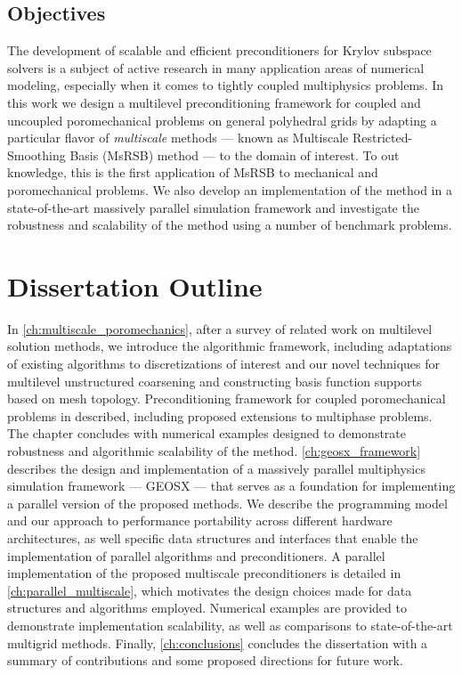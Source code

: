 \subsection{Objectives }
\label{subsec:intro_problem_objective}

The development of scalable and efficient preconditioners for Krylov subspace solvers is a subject of active research in many application areas of numerical modeling, especially when it comes to tightly coupled multiphysics problems.   In this work we design a multilevel preconditioning framework for coupled and uncoupled poromechanical problems on general polyhedral grids by adapting a particular flavor of \textit{multiscale} methods --- known as Multiscale Restricted-Smoothing Basis (MsRSB) method --- to the domain of interest.   To out knowledge, this is the first application of MsRSB to mechanical and poromechanical problems.   We also develop an implementation of the method in a state-of-the-art massively parallel simulation framework and investigate the robustness and scalability of the method using a number of benchmark problems.

\section{Dissertation Outline}
\label{sec:intro_outline}

In \autoref{ch:multiscale_poromechanics}, after a survey of related work on multilevel solution methods, we introduce the algorithmic framework, including adaptations of existing algorithms to discretizations of interest and our novel techniques for multilevel unstructured coarsening and constructing basis function supports based on mesh topology.   Preconditioning framework for coupled poromechanical problems in described, including proposed extensions to multiphase problems.   The chapter concludes with numerical examples designed to demonstrate robustness and algorithmic scalability of the method.   \autoref{ch:geosx_framework} describes the design and implementation of a massively parallel multiphysics simulation framework --- GEOSX --- that serves as a foundation for implementing a parallel version of the proposed methods.   We describe the programming model and our approach to performance portability across different hardware architectures, as well specific data structures and interfaces that enable the implementation of parallel algorithms and preconditioners.   A parallel implementation of the proposed multiscale preconditioners is detailed in \autoref{ch:parallel_multiscale}, which motivates the design choices made for data structures and algorithms employed.   Numerical examples are provided to demonstrate implementation scalability, as well as comparisons to state-of-the-art multigrid methods.   Finally, \autoref{ch:conclusions} concludes the dissertation with a summary of contributions and some proposed directions for future work.